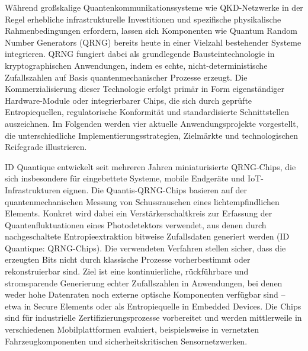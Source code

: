 Während großskalige Quantenkommunikationssysteme wie QKD-Netzwerke in der Regel erhebliche infrastrukturelle Investitionen und spezifische physikalische Rahmenbedingungen erfordern, lassen sich Komponenten wie Quantum Random Number Generators (QRNG) bereits heute in einer Vielzahl bestehender Systeme integrieren. QRNG fungiert dabei als grundlegende Bausteintechnologie in kryptographischen Anwendungen, indem es echte, nicht-deterministische Zufallszahlen auf Basis quantenmechanischer Prozesse erzeugt. Die Kommerzialisierung dieser Technologie erfolgt primär in Form eigenständiger Hardware-Module oder integrierbarer Chips, die sich durch geprüfte Entropiequellen, regulatorische Konformität und standardisierte Schnittstellen auszeichnen. Im Folgenden werden vier aktuelle Anwendungsprojekte vorgestellt, die unterschiedliche Implementierungsstrategien, Zielmärkte und technologischen Reifegrade illustrieren.

ID Quantique entwickelt seit mehreren Jahren miniaturisierte QRNG-Chips, die sich insbesondere für eingebettete Systeme, mobile Endgeräte und IoT-Infrastrukturen eignen. Die Quantis-QRNG-Chips basieren auf der quantenmechanischen Messung von Schussrauschen eines lichtempfindlichen Elements. Konkret wird dabei ein Verstärkerschaltkreis zur Erfassung der Quantenfluktuationen eines Photodetektors verwendet, aus denen durch nachgeschaltete Entropieextraktion bitweise Zufallsdaten generiert werden (ID Quantique: QRNG-Chips). Die verwendeten Verfahren stellen sicher, dass die erzeugten Bits nicht durch klassische Prozesse vorherbestimmt oder rekonstruierbar sind. Ziel ist eine kontinuierliche, rückführbare und stromsparende Generierung echter Zufallszahlen in Anwendungen, bei denen weder hohe Datenraten noch externe optische Komponenten verfügbar sind – etwa in Secure Elements oder als Entropiequelle in Embedded Devices. Die Chips sind für industrielle Zertifizierungsprozesse vorbereitet und werden mittlerweile in verschiedenen Mobilplattformen evaluiert, beispielsweise in vernetzten Fahrzeugkomponenten und sicherheitskritischen Sensornetzwerken.

